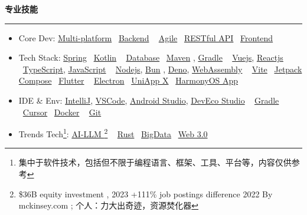 \documentclass[11pt,a4paper]{article}
\renewcommand{\section}[1]{%
    \vspace{0.6em}%
    {\sffamily\Large\bfseries\color{sectioncolor}#1}%
    \vspace{0.2em}%
    \hrule height 0.5pt
    \vspace{0.4em}%
}
\newcommand{\separator}{\textbullet~}  %
\begin{document}
\section{专业技能}
\begin{itemize}
    \item Core Dev: \href{https://baike.baidu.com/item/跨平台技术}{Multi-platform} \separator \href{https://baike.baidu.com/item/后端工程师}{Backend} \separator 
    \href{https://baike.baidu.com/item/敏捷开发模式/8395733}{Agile} \separator \href{https://www.ibm.com/cn-zh/topics/rest-apis}{RESTful API} \separator \href{https://baike.baidu.com/item/前端/5956545}{Frontend}
    \item Tech Stack: \href{https://spring.io/}{Spring} \separator \href{https://www.jetbrains.com/kotlin/}{Kotlin} \separator 
    \href{https://www.mysql.com/cn/}{Database} \separator \href{https://maven.apache.org/}{Maven} , \href{https://gradle.org/}{Gradle} \separator
    \href{https://vuejs.org/}{Vuejs}, \href{https://react.dev/}{Reactjs} \separator \href{https://www.typescriptlang.org/}{TypeScript}, \href{https://www.javascript.com/}{JavaScript} \separator 
    \href{https://nodejs.org/en/}{Nodejs}, \href{https://bun.sh/}{Bun} , \href{https://deno.com/}{Deno}, \href{https://webassembly.org/}{WebAssembly} \separator
    \href{https://vitejs.dev/}{Vite} \separator \href{https://developer.android.google.cn/jetpack/compose}{Jetpack Compose} \separator \href{https://flutter.dev/}{Flutter} \separator 
    \href{https://www.electronjs.org/}{Electron} \separator \href{https://uniapp.dcloud.net.cn/}{UniApp X} \separator \href{https://developer.huawei.com/consumer/cn/}{HarmonyOS App}
    \item IDE \& Env: \href{https://www.jetbrains.com/}{IntelliJ}, \href{https://code.visualstudio.com/}{VSCode}, \href{https://developer.android.google.cn/studio}{Android Studio}, \href{https://developer.harmonyos.com/cn/develop/deveco-studio}{DevEco Studio} \separator 
    \href{https://gradle.org/}{Gradle} \separator \href{https://www.cursor.com/}{Cursor} \separator \href{https://www.docker.com/}{Docker} \separator 
    \href{https://git-scm.com/}{Git}
    \item Trends Tech\footnote{集中于软件技术，包括但不限于编程语言、框架、工具、平台等，内容仅供参考}: \href{https://www.ibm.com/cn-zh/topics/large-language-models}{AI-LLM \footnote{ {\$36B equity investment , 2023 +111\% job postings difference 2022 }By mckinsey.com ; 个人：力大出奇迹，资源焚化器} } \separator 
    \href{https://www.rust-lang.org/}{Rust} \separator \href{https://www.bigdata.com/}{BigData} \separator \href{https://baike.baidu.com/item/web3.0/4873257}{Web 3.0}
\end{itemize}
\end{document}
